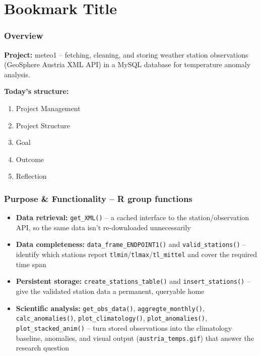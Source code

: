 \documentclass[11pt,t,usepdftitle=false,aspectratio=169]{beamer}
\begin{document}
\section{Bookmark Title}

\begin{frame}
\frametitle{Overview}

  \textbf{Project:} meteo1 -- fetching, cleaning, and storing weather
  station observations (GeoSphere Austria XML API) in a MySQL database
  for temperature anomaly analysis.

  \bigskip

  \textbf{Today's structure:}
  \begin{enumerate}
    \item Project Management
    \item Project Structure
    \item Goal
    \item Outcome
    \item Reflection
  \end{enumerate}

\end{frame}



\begin{frame}[fragile]
\frametitle{Purpose \& Functionality -- R group functions}

  \begin{itemize}
    \item \textbf{Data retrieval:} \texttt{get\_XML()} -- a cached
      interface to the station/observation API, so the same data isn't
      re-downloaded unnecessarily

    \bigskip

    \item \textbf{Data completeness:} \texttt{data\_frame\_ENDPOINT1()}
      and \texttt{valid\_stations()} -- identify which stations report
      \texttt{tlmin}/\texttt{tlmax}/\texttt{tl\_mittel} and cover the
      required time span

    \bigskip

    \item \textbf{Persistent storage:} \texttt{create\_stations\_table()}
      and \texttt{insert\_stations()} -- give the validated station
      data a permanent, queryable home

    \bigskip

    \item \textbf{Scientific analysis:} \texttt{get\_obs\_data()},
      \texttt{aggregte\_monthly()}, \texttt{calc\_anomalies()},
      \texttt{plot\_climatology()}, \texttt{plot\_anomalies()},
      \texttt{plot\_stacked\_anim()} -- turn stored observations into
      the climatology baseline, anomalies, and visual output
      (\texttt{austria\_temps.gif}) that answer the research question
  \end{itemize}

\end{frame}
\end{document}
